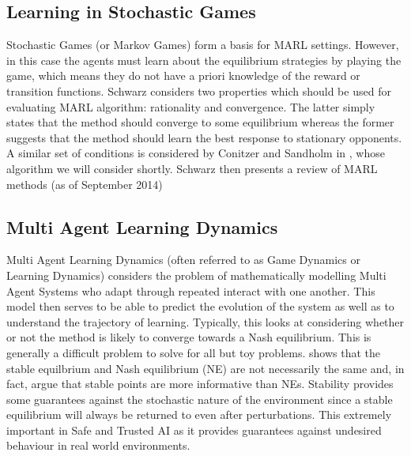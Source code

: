 \documentclass[.../main.tex]{subfiles}
\begin{document}
\subsection{Learning in Stochastic Games} \label{sec::Learning_Stochastic_Games}

Stochastic Games (or Markov Games) form a basis for MARL settings. However, in this case the agents
must learn about the equilibrium strategies by playing the game, which means they do not have a
priori knowledge of the reward or transition functions. Schwarz considers two properties which
should be used for evaluating MARL algorithm: rationality and convergence. The latter simply states
that the method should converge to some equilibrium whereas the former suggests that the method
should learn the best response to stationary opponents. A similar set of conditions is considered by
Conitzer and Sandholm in \cite{ConitzerAWESOME:}, whose algorithm we will consider shortly. Schwarz
then presents a review of MARL methods (as of September 2014)


\subsection{Multi Agent Learning Dynamics} \label{sec::MARL_Dynamics}

Multi Agent Learning Dynamics (often referred to as Game Dynamics or Learning Dynamics)
considers the
problem of mathematically modelling Multi Agent Systems who adapt through repeated interact with one
another. This model then serves to be able to predict the evolution of the system as well as to
understand the trajectory of learning. Typically, this looks at considering whether or not the
method is likely to converge towards a Nash equilibrium. This is generally a difficult problem to
solve \cite{ShohamMultiagentFoundations} for all but toy problems.
\cite{Letcher2019DifferentiableMechanics} shows that the stable equilbrium and Nash equilibrium (NE)
are not necessarily the same and, in fact, argue that stable points are more informative than NEs.
Stability provides some guarantees against the stochastic nature of the environment since a stable
equilibrium will always be returned to even after perturbations. This extremely important in Safe
and Trusted AI as it provides guarantees against undesired behaviour in real world environments.
\end{document}
